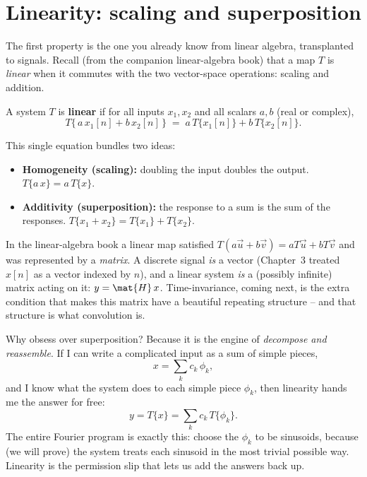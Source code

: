 \section{Linearity: scaling and superposition}
\label{ch12:linearity}

The first property is the one you already know from linear algebra, transplanted
to signals. Recall (from the companion linear-algebra book) that a map $T$ is
\emph{linear} when it commutes with the two vector-space operations: scaling and
addition.

\begin{definition}[Linearity]
\label{ch12:def-linear}
A system $T$ is \textbf{linear} if for all inputs $x_1, x_2$ and all scalars
$a, b$ (real or complex),
\[
  T\{\,a\,x_1[n] + b\,x_2[n]\,\} \;=\; a\,T\{x_1[n]\} + b\,T\{x_2[n]\}.
\]
\end{definition}

This single equation bundles two ideas:
\begin{itemize}
  \item \textbf{Homogeneity (scaling):} doubling the input doubles the output.
        $T\{a\,x\} = a\,T\{x\}$.
  \item \textbf{Additivity (superposition):} the response to a sum is the sum of
        the responses. $T\{x_1 + x_2\} = T\{x_1\} + T\{x_2\}$.
\end{itemize}

\begin{connectionbox}
In the linear-algebra book a linear map satisfied $T(a\vec u + b\vec v) = a
T\vec u + b T\vec v$ and was represented by a \emph{matrix}. A discrete signal
\emph{is} a vector (Chapter~3 treated $x[n]$ as a vector indexed by $n$), and a
linear system \emph{is} a (possibly infinite) matrix acting on it:
$y = \mat{H}\,x$. Time-invariance, coming next, is the extra condition that
makes this matrix have a beautiful repeating structure -- and that structure is
what convolution is.
\end{connectionbox}

\begin{whybox}
Why obsess over superposition? Because it is the engine of \emph{decompose and
reassemble}. If I can write a complicated input as a sum of simple pieces,
\[
  x = \sum_k c_k\,\phi_k,
\]
and I know what the system does to each simple piece $\phi_k$, then linearity
hands me the answer for free:
\[
  y = T\{x\} = \sum_k c_k\,T\{\phi_k\}.
\]
The entire Fourier program is exactly this: choose the $\phi_k$ to be sinusoids,
because (we will prove) the system treats each sinusoid in the most trivial
possible way. Linearity is the permission slip that lets us add the answers back
up.
\end{whybox}


